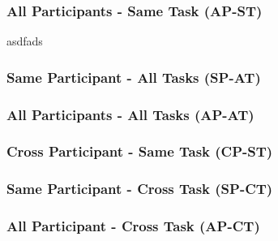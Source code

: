 \documentclass[11pt]{article}
\begin{document}
		\subsubsection{All Participants - Same Task (AP-ST)}
		\begin{figure}
		\centering
		\caption{}
		\label{fig:ap-st}
		\end{figure} 
		asdfads
		
		\subsubsection{Same Participant - All Tasks (SP-AT)}
		\begin{figure}
		\centering
		\caption{}
		\label{fig:sp-at}
		\end{figure} 
		
		\subsubsection{All Participants - All Tasks (AP-AT)}
		
		\subsubsection{Cross Participant - Same Task (CP-ST)}
		\begin{figure}
		\centering
		\caption{}
		\label{fig:cp-st}
		\end{figure} 
		
		\subsubsection{Same Participant - Cross Task (SP-CT)}
		\begin{figure}
		\centering
		\caption{}
		\label{fig:sp-ct}
		\end{figure} 
		
		\subsubsection{All Participant - Cross Task (AP-CT)}
		\begin{figure}
		\centering
		\caption{}
		\label{fig:ap-ct}
		\end{figure} 
		
\end{document}

